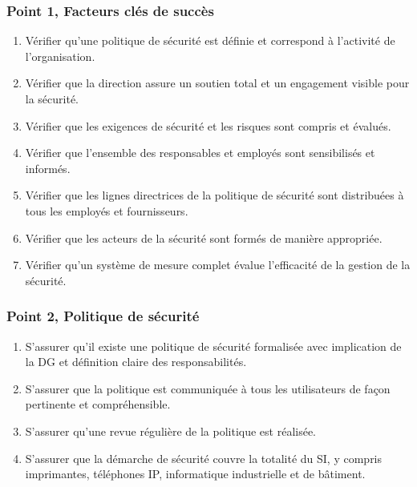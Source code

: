 \subsubsection{Point 1, Facteurs clés de succès}
\begin{enumerate}[label=1.\arabic*.]
    \item Vérifier qu'une politique de sécurité est définie et correspond à l'activité de l'organisation.
    \item Vérifier que la direction assure un soutien total et un engagement visible pour la sécurité.
    \item Vérifier que les exigences de sécurité et les risques sont compris et évalués.
    \item Vérifier que l'ensemble des responsables et employés sont sensibilisés et informés.
    \item Vérifier que les lignes directrices de la politique de sécurité sont distribuées à tous les employés et fournisseurs.
    \item Vérifier que les acteurs de la sécurité sont formés de manière appropriée.
    \item Vérifier qu'un système de mesure complet évalue l'efficacité de la gestion de la sécurité.
\end{enumerate}

\subsubsection{Point 2, Politique de sécurité}
\begin{enumerate}[label=2.\arabic*.]
    \item S'assurer qu'il existe une politique de sécurité formalisée avec implication de la DG et définition claire des responsabilités.
    \item S'assurer que la politique est communiquée à tous les utilisateurs de façon pertinente et compréhensible.
    \item S'assurer qu'une revue régulière de la politique est réalisée.
    \item S'assurer que la démarche de sécurité couvre la totalité du SI, y compris imprimantes, téléphones IP, informatique industrielle et de bâtiment.
\end{enumerate}

